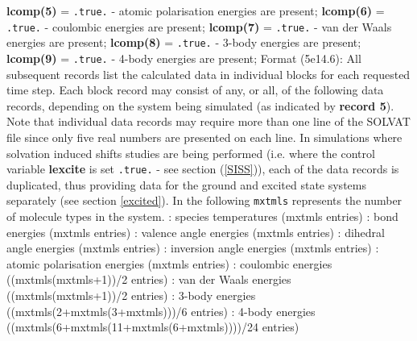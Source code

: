 {\bf lcomp(5)} = {\tt .true.} - atomic polarisation energies are present;\newline
{\bf lcomp(6)} = {\tt .true.} - coulombic energies are present;\newline
{\bf lcomp(7)} = {\tt .true.} - van der Waals energies are present;\newline
{\bf lcomp(8)} = {\tt .true.} - 3-body energies are present;\newline
{\bf lcomp(9)} = {\tt .true.} - 4-body energies are present;\newline
\newline
{} Format (5e14.6): All subsequent records
list the calculated data in individual blocks for each requested time step.
Each block record may consist of any, or all, of the following data records,
depending on the system being simulated (as indicated by {\bf record 5}).
Note that individual data records may require more than one line of the SOLVAT
file since only five real numbers are presented on each line.  In simulations
where solvation induced shifts studies are being performed (i.e. where the
control variable {\bf lexcite} is set {\tt .true.} - see section
(\ref{SISS})), each of the data records is duplicated, thus providing data for
the ground and excited state systems separately (see section \ref{excited}).
In the following {\tt mxtmls} represents the number of molecule types in the
system.\newline\newline
{}: species temperatures (mxtmls entries)\newline\newline
{}: bond energies (mxtmls entries)\newline\newline
{}: valence angle energies (mxtmls entries)\newline\newline
{}: dihedral angle energies (mxtmls entries)\newline\newline
{}: inversion angle energies (mxtmls entries)\newline\newline
{}: atomic polarisation energies (mxtmls entries)\newline\newline
{}: coulombic energies ((mxtmls(mxtmls+1))/2 entries)\newline\newline
{}: van der Waals energies ((mxtmls(mxtmls+1))/2 entries)\newline\newline
{}: 3-body energies ((mxtmls(2+mxtmls(3+mxtmls)))/6 entries)\newline\newline
{}: 4-body energies
((mxtmls(6+mxtmls(11+mxtmls(6+mxtmls))))/24 entries)\newline\newline

